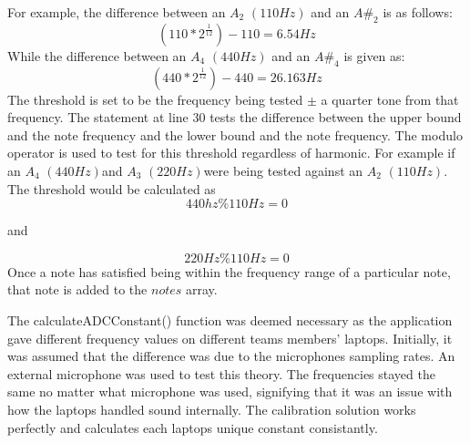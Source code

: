 \documentclass[12pt,a4paper]{article}
\begin{document}
\begin{itemize}
						For example, the difference between an $A_2$ $(110Hz)$ and an $A\#_2$ is as follows:
						$$
							(110 * 2^{\frac{1}{12}}) - 110 = 6.54Hz
						$$
						While the difference between an $A_{4}$ $(440Hz)$ and an $A\#_4$ is given as:
						$$
							(440 * 2^{\frac{1}{12}}) - 440 = 26.163Hz
						$$
\newpage
\vspace*{5mm}
					The threshold is set to be the frequency being tested $\pm$ a quarter tone from that frequency. The statement at line 30 tests the difference between the upper
					bound and the note frequency and the lower bound and the note frequency. The modulo operator is used to test for this threshold regardless of harmonic.
						For example if an $A_4$ $(440Hz)$and $A_3$ $(220Hz)$were being tested against an $A_2$ $(110Hz)$. The threshold would be calculated as $$440hz \% 110Hz = 0$$
						\begin{center}and\end{center} $$220Hz \% 110Hz = 0$$
						Once a note has satisfied being within the frequency range of a particular note, that note is added to the $notes$ array.
					\normalsize
		\end{itemize}

\newpage

\vspace*{5mm}
		The calculateADCConstant() function was deemed necessary as the application gave different frequency values on different teams members' laptops. Initially, it was assumed that the difference was due to the
		microphones sampling rates. An external microphone was used to test this theory. The frequencies stayed the same no matter what microphone was used, signifying that it was an issue with 
		how the laptops handled sound internally.
		The calibration solution works perfectly and calculates each laptops unique constant consistantly.
\end{document}
